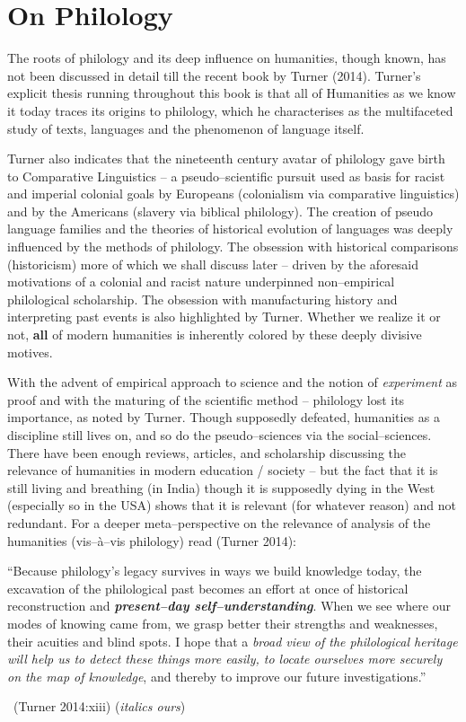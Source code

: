 \section*{On Philology}

The roots of philology and its deep influence on humanities, though known, has not been discussed in detail till the recent book by Turner (2014). Turner’s explicit thesis running throughout this book is that all of Humanities as we know it today traces its origins to philology, which he characterises as the multifaceted study of texts, languages and the phenomenon of language itself.

Turner also indicates that the nineteenth century avatar of philology gave birth to Comparative Linguistics – a pseudo–scientific pursuit used as basis for racist and imperial colonial goals by Europeans (colonialism via comparative linguistics) and by the Americans (slavery via biblical philology). The creation of pseudo language families and the theories of historical evolution of languages was deeply influenced by the methods of philology. The obsession with historical comparisons (historicism) more of which we shall discuss later – driven by the aforesaid motivations of a colonial and racist nature underpinned non–empirical philological scholarship. The obsession with manufacturing history and interpreting past events is also highlighted by Turner. Whether we realize it or not, \textbf{all} of modern humanities is inherently colored by these deeply divisive motives.

With the advent of empirical approach to science and the notion of \textit{experiment} as proof and with the maturing of the scientific method – philology lost its importance, as noted by Turner. Though supposedly defeated, humanities as a discipline still lives on, and so do the pseudo–sciences via the social–sciences. There have been enough reviews, articles, and scholarship discussing the relevance of humanities in modern education / society – but the fact that it is still living and breathing (in India) though it is supposedly dying in the West (especially so in the USA) shows that it is relevant (for whatever reason) and not redundant. For a deeper meta–perspective on the relevance of analysis of the humanities (vis–à–vis philology) read (Turner 2014):

\begin{myquote}
“Because philology’s legacy survives in ways we build knowledge today, the excavation of the philological past becomes an effort at once of historical reconstruction and \textbf{\textit{present–day self–understanding}}. When we see where our modes of knowing came from, we grasp better their strengths and weaknesses, their acuities and blind spots. I hope that a \textit{broad view of the philological heritage will help us to detect these things more easily, to locate ourselves more securely on the map of knowledge}, and thereby to improve our future investigations.” 

~\hfill (Turner 2014:xiii) (\textit{italics ours})
\end{myquote}


